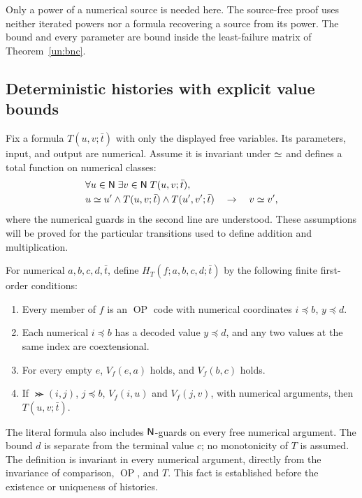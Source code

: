 Only a power of a numerical source is needed here. The source-free
proof uses neither iterated powers nor a formula recovering a source
from its power. The bound and every parameter are bound inside the
least-failure matrix of Theorem~\ref{un:bnc}.

\subsection{Deterministic histories with explicit value bounds}

Fix a formula $T(u,v;\bar t)$ with only the displayed free variables.
Its parameters, input, and output are numerical. Assume it is invariant
under $\mathrel{\simeq}$ and defines a total function on numerical classes:
\[
\begin{split}
 &\forall u\in\mathsf{N}\;\exists v\in\mathsf{N}\;T(u,v;\bar t),\\
 &u\mathrel{\simeq} u'\land T(u,v;\bar t)\land T(u',v';\bar t)
                                      \quad\to\quad v\mathrel{\simeq} v',
\end{split}
\]
where the numerical guards in the second line are understood.
These assumptions will be proved for the particular transitions used
to define addition and multiplication.

For numerical $a,b,c,d,\bar t$, define
$H_T(f;a,b,c,d;\bar t)$ by the following finite first-order conditions:
\begin{enumerate}
\item Every member of $f$ is an $\operatorname{OP}$ code with numerical
      coordinates $i\preccurlyeq b$, $y\preccurlyeq d$.
\item Each numerical $i\preccurlyeq b$ has a decoded value
      $y\preccurlyeq d$, and any two values at the same index are
      coextensional.
\item For every empty $e$, $V_f(e,a)$ holds, and $V_f(b,c)$ holds.
\item If $\Succ(i,j)$, $j\preccurlyeq b$, $V_f(i,u)$ and $V_f(j,v)$,
      with numerical arguments, then $T(u,v;\bar t)$.
\end{enumerate}
The literal formula also includes $\mathsf{N}$-guards on every free numerical
argument. The bound $d$ is separate from the terminal value $c$; no
monotonicity of $T$ is assumed. The definition is invariant in every
numerical argument, directly from the invariance of comparison,
$\operatorname{OP}$, and $T$. This fact is established before the
existence or uniqueness of histories.

